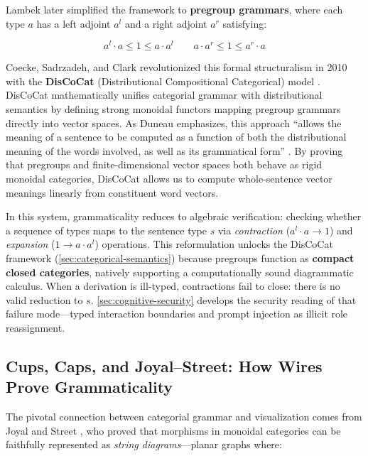 \documentclass[
]{article}
\begin{document}
Lambek \citeyearpar{lambek2004fine} later simplified the framework to
\textbf{pregroup grammars}, where each type \(a\) has a left adjoint
\(a^l\) and a right adjoint \(a^r\) satisfying:

\begin{equation}
a^l \cdot a \leq 1 \leq a \cdot a^l \qquad a \cdot a^r \leq 1 \leq a^r \cdot a
\label{eq:eq-3-2}
\end{equation}

Coecke, Sadrzadeh, and Clark revolutionized this formal structuralism in
2010 with the \textbf{DisCoCat} (Distributional Compositional
Categorical) model \citeyearpar{coecke2010mathematical}. DisCoCat
mathematically unifies categorial grammar with distributional semantics
by defining strong monoidal functors mapping pregroup grammars directly
into vector spaces. As Duneau emphasizes, this approach ``allows the
meaning of a sentence to be computed as a function of both the
distributional meaning of the words involved, as well as its grammatical
form'' \citeyearpar{duneau2021parsing}. By proving that pregroups and
finite-dimensional vector spaces both behave as rigid monoidal
categories, DisCoCat allows us to compute whole-sentence vector meanings
linearly from constituent word vectors.

In this system, grammaticality reduces to algebraic verification:
checking whether a sequence of types maps to the sentence type \(s\) via
\emph{contraction} (\(a^l \cdot a \to 1\)) and \emph{expansion}
(\(1 \to a \cdot a^l\)) operations. This reformulation unlocks the
DisCoCat framework (\autoref{sec:categorical-semantics}) because
pregroups function as \textbf{compact closed categories}, natively
supporting a computationally sound diagrammatic calculus. When a
derivation is ill-typed, contractions fail to close: there is no valid
reduction to \(s\). \autoref{sec:cognitive-security} develops the
security reading of that failure mode---typed interaction boundaries and
prompt injection as illicit role reassignment.

\subsection{Cups, Caps, and Joyal--Street: How Wires Prove
Grammaticality}\label{cups-caps-and-joyalstreet-how-wires-prove-grammaticality}

The pivotal connection between categorial grammar and visualization
comes from Joyal and Street \citeyearpar{joyalstreet1991geometry}, who
proved that morphisms in monoidal categories can be faithfully
represented as \emph{string diagrams}---planar graphs where:
\end{document}
